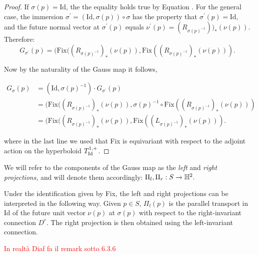     \begin{proof}
        If $\sigma(p)=\text{Id}$, the the equality holds true by Equation . For the general case, the immersion $\sigma^{\prime} =(\text{Id},\sigma(p))\circ\sigma$ has the property that $\sigma^{\prime}(p)=\text{Id}$, and the future normal vector at $\sigma^{\prime} (p)$ equals $\nu^{\prime} (p)=(R_{\sigma(p)^{-1}}))_{\ast} (\nu(p))$. Therefore: 
        \[
            G_{\sigma^{\prime} }(p)=(\text{Fix}((R_{\sigma(p)^{-1}})_{\ast} (\nu(p)),\text{Fix}((R_{\sigma(p)^{-1}})_{\ast} (\nu(p))).
        \]

        Now by the naturality of the Gauss map it follows, 
        
        \begin{align*}
            G_\sigma(p)&=(\text{Id},\sigma(p)^{-1})\cdot G_{\sigma^{\prime}}(p) \\
            &=(\text{Fix}((R_{\sigma(p)^{-1}})_{\ast} (\nu(p)),\sigma(p)^{-1}\circ\text{Fix}((R_{\sigma(p)^{-1}})_{\ast} (\nu(p))) \\
            &=(\text{Fix}((R_{\sigma(p)^{-1}})_{\ast} (\nu(p)),\text{Fix}((L_{\sigma(p)^{-1}})_{\ast} (\nu(p))).
        \end{align*}
        
        where in the last line we used that Fix is equivariant with respect to the adjoint action on the hyperboloid $T_{\text{Id}}^{1,+}$.
        
    \end{proof}

    We will refer to the components of the Gauss map as the \textit{left} and \textit{right projections,} and will denote them accordingly: $\Pi_{l},\Pi_{r}:S\to\mathbb{H}^2.$\\

\begin{observation}
    Under the identification given by Fix, the left and right projections can be interpreted in the following way. Given $p\in S$, $\Pi_l(p)$ is the parallel transport in Id of the future unit vector $\nu(p)$ at $\sigma(p)$ with respect to the right-invariant connection $D^r$. The right projection is then obtained using the left-invariant connection. 

    \textcolor{red}{In realtà Diaf fa il remark sotto 6.3.6}
\end{observation}


